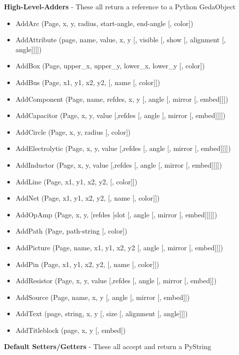 \textbf{High-Level-Adders}
 - These all return a reference to a Python GedaObject

 \begin{itemize}
\item AddArc (Page, x, y, radius, start-angle, end-angle [, color])
\item AddAttribute (page, name, value, x, y [, visible [, show [, alignment [, angle]]]])
\item AddBox (Page, upper\_x, upper\_y, lower\_x, lower\_y [, color])
\item AddBus (Page, x1, y1, x2, y2, [, name [, color]])
\item AddComponent (Page, name, refdes, x, y [, angle [, mirror [, embed]]])
\item AddCapacitor (Page, x, y, value [,refdes [, angle [, mirror [, embed]]]])
\item AddCircle (Page, x, y, radius [, color])
\item AddElectrolytic (Page, x, y, value [,refdes [, angle [, mirror [, embed]]]])
\item AddInductor (Page, x, y, value [,refdes [, angle [, mirror [, embed]]]])
\item AddLine (Page, x1, y1, x2, y2, [, color]])
\item AddNet (Page, x1, y1, x2, y2, [, name [, color]])
\item AddOpAmp (Page, x, y, [refdes [slot [, angle [, mirror [, embed]]]]])
\item AddPath (Page, path-string [, color])
\item AddPicture (Page, name, x1, y1, x2, y2 [, angle [, mirror [, embed]]])
\item AddPin (Page, x1, y1, x2, y2, [, name [, color]])
\item AddResistor (Page, x, y, value [,refdes [, angle [, mirror [, embed]])
\item AddSource (Page, name, x, y [, angle [, mirror [, embed]])
\item AddText (page, string, x, y [, size [, alignment [, angle]]])
\item AddTitleblock (page, x, y [, embed])

\end{itemize}


 \textbf{Default Setters/Getters}
 - These all accept and return a PyString


